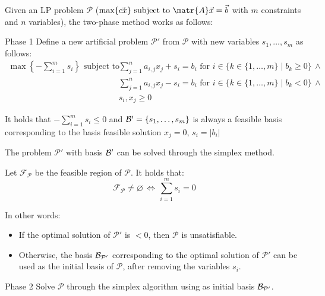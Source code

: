 Given an LP problem $\mathcal{P}$ ($\max\{ \vec{cx} \} \text{ subject to } \matr{A}\vec{x} = \vec{b}$ with $m$ constraints and $n$ variables), 
the two-phase method works as follows:
\begin{descriptionlist}
    \item[Phase 1] 
        Define a new artificial problem $\mathcal{P}'$ from $\mathcal{P}$ with new variables $s_1, \dots, s_m$ as follows:
        \[
            \begin{split}
                \max\left\{ -\sum_{i=1}^{m} s_i \right\} \text{ subject to } 
                    &\sum_{j=1}^{n} a_{i,j} x_j + s_i = b_i \text{ for } i \in \{ k \in \{ 1, \dots, m \} \mid b_k \geq 0 \} \,\land \\
                    &\sum_{j=1}^{n} a_{i,j} x_j - s_i = b_i \text{ for } i \in \{ k \in \{ 1, \dots, m \} \mid b_k < 0 \} \,\land \\
                    & s_i, x_j \geq 0
            \end{split}
        \]

        \begin{remark}
            It holds that $-\sum_{i=1}^{m} s_i \leq 0$ and 
            $\mathcal{B}' = \{ s_1, \dots, s_m \}$ is always a feasible basis corresponding to the basis feasible solution $x_j = 0$, $s_i = \vert b_i \vert$
        \end{remark}

        The problem $\mathcal{P}'$ with basis $\mathcal{B}'$ can be solved through the simplex method.

        \begin{theorem}
            Let $\mathcal{F}_\mathcal{P}$ be the feasible region of $\mathcal{P}$. It holds that:
            \[ \mathcal{F}_\mathcal{P} \neq \varnothing \,\iff\, \sum_{i=1}^{m} s_i = 0 \]

            In other words:
            \begin{itemize}
                \item If the optimal solution of $\mathcal{P}'$ is  $< 0$, then $\mathcal{P}$ is unsatisfiable.
                \item Otherwise, the basis $\mathcal{B}_{\mathcal{P}'}$ corresponding to the optimal solution of $\mathcal{P}'$ 
                    can be used as the initial basis of $\mathcal{P}$, after removing the variables $s_i$.
            \end{itemize}
        \end{theorem}

    \item[Phase 2] 
        Solve $\mathcal{P}$ through the simplex algorithm using as initial basis $\mathcal{B}_{\mathcal{P}'}$.
\end{descriptionlist}


